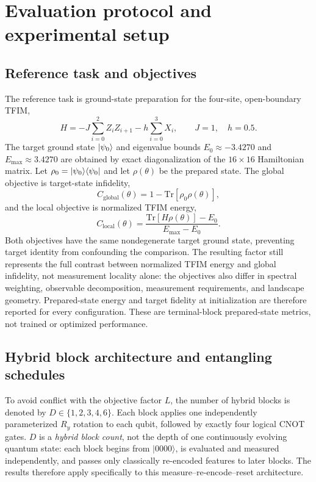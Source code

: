 \documentclass[pdflatex,sn-basic,Numbered]{sn-jnl}
\begin{document}
\section{Evaluation protocol and experimental setup}\label{sec:methods}
\subsection{Reference task and objectives}

The reference task is ground-state preparation for the four-site, open-boundary TFIM,
\[
H=-J\sum_{i=0}^{2}Z_i Z_{i+1}-h\sum_{i=0}^{3}X_i,
\qquad J=1,\quad h=0.5.
\]
The target ground state $\ket{\psi_0}$ and eigenvalue bounds $E_0\approx-3.4270$ and $E_{\max}\approx3.4270$ are obtained by exact diagonalization of the $16\times16$ Hamiltonian matrix. Let $\rho_0=\ket{\psi_0}\!\bra{\psi_0}$ and let $\rho(\theta)$ be the prepared state. The global objective is target-state infidelity,
\[
C_{\mathrm{global}}(\theta)
=1-\mathrm{Tr}[\rho_0\rho(\theta)],
\]
and the local objective is normalized TFIM energy,
\[
C_{\mathrm{local}}(\theta)
=\frac{\mathrm{Tr}[H\rho(\theta)]-E_0}{E_{\max}-E_0}.
\]
Both objectives have the same nondegenerate target ground state, preventing target identity from confounding the comparison. The resulting factor still represents the full contrast between normalized TFIM energy and global infidelity, not measurement locality alone: the objectives also differ in spectral weighting, observable decomposition, measurement requirements, and landscape geometry. Prepared-state energy and target fidelity at initialization are therefore reported for every configuration. These are terminal-block prepared-state metrics, not trained or optimized performance.

\subsection{Hybrid block architecture and entangling schedules}
\label{sec:ansatz}

To avoid conflict with the objective factor $L$, the number of hybrid blocks is denoted by $D\in\{1,2,3,4,6\}$. Each block applies one independently parameterized $R_y$ rotation to each qubit, followed by exactly four logical CNOT gates. $D$ is a \emph{hybrid block count}, not the depth of one continuously evolving quantum state: each block begins from $\lvert0000\rangle$, is evaluated and measured independently, and passes only classically re-encoded features to later blocks. The results therefore apply specifically to this measure--re-encode--reset architecture.
\end{document}
